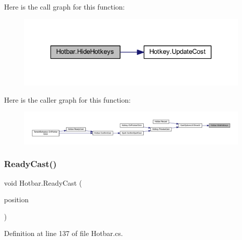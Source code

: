 Here is the call graph for this function\+:
\nopagebreak
\begin{figure}[H]
\begin{center}
\leavevmode
\includegraphics[width=321pt]{class_hotbar_a2f8af9863292223ae00d361121164160_cgraph}
\end{center}
\end{figure}
Here is the caller graph for this function\+:
\nopagebreak
\begin{figure}[H]
\begin{center}
\leavevmode
\includegraphics[width=350pt]{class_hotbar_a2f8af9863292223ae00d361121164160_icgraph}
\end{center}
\end{figure}
\mbox{\label{class_hotbar_a5ac379c585126b8e0e35c061b3388ecf}} 
\subsubsection{\texorpdfstring{ReadyCast()}{ReadyCast()}}
{\footnotesize\ttfamily void Hotbar.\+Ready\+Cast (\begin{DoxyParamCaption}\item[{Vector2\+Int}]{position }\end{DoxyParamCaption})}



Definition at line 137 of file Hotbar.\+cs.

